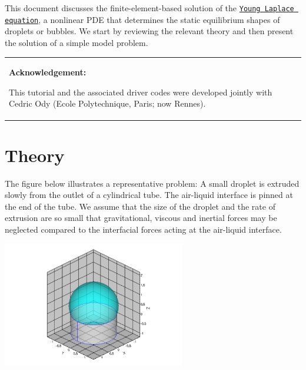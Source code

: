 This document discusses the finite-\/element-\/based solution of the \href{http://en.wikipedia.org/wiki/Young-Laplace_equation}{\tt Young Laplace equation}, a nonlinear P\+DE that determines the static equilibrium shapes of droplets or bubbles. We start by reviewing the relevant theory and then present the solution of a simple model problem.

\begin{center} \tabulinesep=1mm
\begin{longtabu} spread 0pt [c]{*{1}{|X[-1]}|}
\hline
\begin{center} {\bfseries Acknowledgement\+:} \end{center}  This tutorial and the associated driver codes were developed jointly with Cedric Ody (Ecole Polytechnique, Paris; now Rennes). ~\newline
~\newline
  \\
\end{longtabu}
\end{center} \hypertarget{index_theory}{}\section{Theory}\label{index_theory}
The figure below illustrates a representative problem\+: A small droplet is extruded slowly from the outlet of a cylindrical tube. The air-\/liquid interface is pinned at the end of the tube. We assume that the size of the droplet and the rate of extrusion are so small that gravitational, viscous and inertial forces may be neglected compared to the interfacial forces acting at the air-\/liquid interface.

 
\begin{DoxyImage}
\includegraphics[width=0.6\textwidth]{spherical_cap}
\end{DoxyImage}


